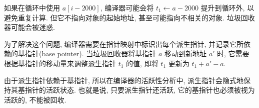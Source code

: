 如果在循环中使用 $a[i-2000]$, 编译器可能会将 $t_1 \leftarrow a - 2000$ 提升到循环外, 以避免重复计算. 但它不指向对象的起始地址, 甚至可能指向不相关的对象. 垃圾回收器可能会被迷惑. 

为了解决这个问题, 编译器需要在指针映射中标识出每个派生指针, 并记录它所依赖的基指针(base pointer). 当垃圾回收器将基指针 $a$ 移动到新地址 $a'$ 时, 它需要根据基指针的移动量来调整派生指针 $t_1$ 的值, 即将 $t_1$ 更新为 $t_1 + a' - a$. 

由于派生指针依赖于基指针, 所以在编译器的活跃性分析中, 派生指针会隐式地保持其基指针的活跃状态. 也就是说, 只要派生指针还活跃, 它的基指针也必须被视为活跃的, 不能被回收. 
